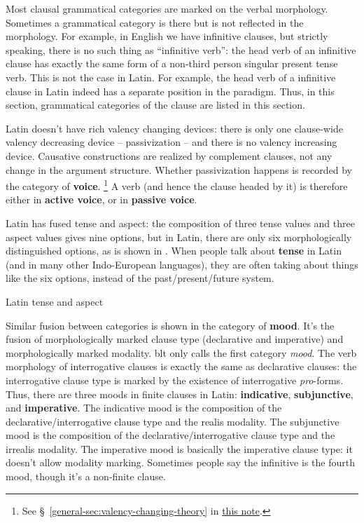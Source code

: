 \documentclass{article}
\newcommand*{\citesec}[1]{\S~{#1}}
\newcommand*{\concept}[1]{\textbf{#1}}
\newcommand*{\term}[1]{\emph{#1}}
\newcommand{\general}{\href{../methodology/glossing.pdf}{this note}}
\begin{document}
Most clausal grammatical categories are marked on the verbal morphology.
Sometimes a grammatical category is there but is not reflected in the morphology.
For example, in English we have infinitive clauses,
but strictly speaking, there is no such thing as ``infinitive verb'':
the head verb of an infinitive clause 
has exactly the same form of a non-third person singular present tense verb.
This is not the case in Latin.
For example, the head verb of a infinitive clause in Latin 
indeed has a separate position in the paradigm.
Thus, in this section,
grammatical categories of the clause are listed in this section.

Latin doesn't have rich valency changing devices:
there is only one clause-wide valency decreasing device -- passivization -- 
and there is no valency increasing device.
Causative constructions are realized by complement clauses,
not any change in the argument structure.
Whether passivization happens is recorded by the category of \concept{voice}.%
\footnote{
    See \citesec{\ref{general-sec:valency-changing-theory}} in \general.
}
A verb (and hence the clause headed by it) is therefore either in \concept{active voice},
or in \concept{passive voice}.

Latin has fused tense and aspect:
the composition of three tense values and three aspect values 
gives nine options,
but in Latin, there are only six morphologically distinguished options,
as is shown in . 
When people talk about \concept{tense} in Latin (and in many other Indo-European languages),
they are often taking about things like the six options,
instead of the past/present/future system.

\begin{table}
    \caption{Latin tense and aspect}
    \label{tbl:latin-tense-aspect}
    \centering
        
\end{table}

Similar fusion between categories is shown in the category of \concept{mood}.
It's the fusion of morphologically marked clause type 
(declarative and imperative)
and morphologically marked modality.
\acs{blt} only calls the first category \term{mood}.
The verb morphology of interrogative clauses is exactly the same as declarative clauses:
the interrogative clause type is marked by the existence of interrogative \term{pro}-forms.
Thus, there are three moods in finite clauses in Latin:
\concept{indicative}, \concept{subjunctive}, and \concept{imperative}.
The indicative mood is the composition of 
the declarative/interrogative clause type and the realis modality.
The subjunctive mood is the composition of 
the declarative/interrogative clause type and the irrealis modality.
The imperative mood is basically the imperative clause type:
it doesn't allow modality marking.
Sometimes people say the infinitive is the fourth mood,
though it's a non-finite clause.
\end{document}
